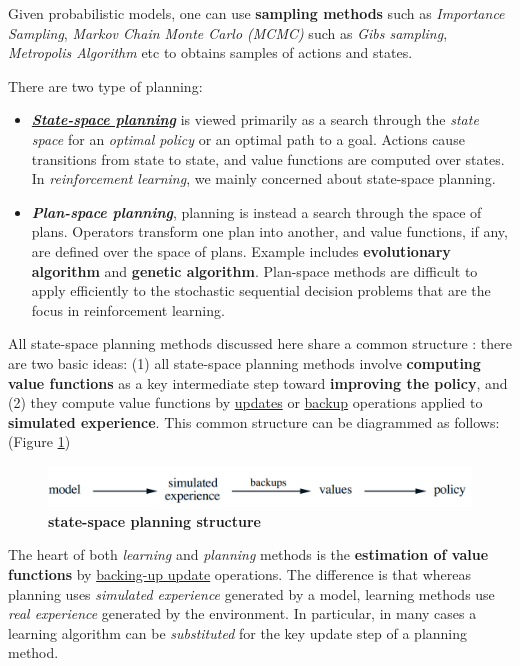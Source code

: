 \documentclass[11pt]{article}
\begin{document}
Given probabilistic models, one can use \textbf{sampling methods} \citep{liu2001monte} such as \emph{Importance Sampling},  \emph{Markov Chain Monte Carlo (MCMC)} such as \emph{Gibs sampling}, \emph{Metropolis Algorithm} etc to obtains samples of actions and states. 


There are two type of planning:
\begin{itemize}
\item \underline{\emph{\textbf{State-space planning}}} is viewed primarily as a search through the \emph{state space} for an \emph{optimal policy} or an optimal path to a goal. Actions cause transitions from state to state, and value functions are computed over states. In \emph{reinforcement learning}, we mainly concerned about state-space planning. 

\item \emph{\textbf{Plan-space planning}}, planning is instead a search through the space of plans. Operators transform one plan into another, and value functions, if any, are defined over the space of plans. Example includes \textbf{evolutionary algorithm} and \textbf{genetic algorithm}.  Plan-space methods are difficult to apply efficiently to the stochastic sequential decision problems that are the focus in reinforcement learning.
\end{itemize}

All state-space planning methods discussed here share a common structure : there are two basic ideas: (1) all state-space planning methods involve \textbf{computing value functions} as a key intermediate step toward \textbf{improving the policy}, and (2) they compute value functions by \underline{updates} or \underline{backup} operations applied to \textbf{simulated experience}. This common structure can be diagrammed as follows: (Figure \ref{fig: state_space_planning})

\begin{figure}
\begin{minipage}[t]{1\linewidth}
  \centering
  \centerline{\includegraphics[scale = 0.3]{state-space_planning.png}}
\end{minipage}
\caption{\footnotesize{\textbf{state-space planning structure}}}
\label{fig: state_space_planning}
\end{figure}

The heart of both \emph{learning} and \emph{planning} methods is the \textbf{estimation of value functions} by \underline{backing-up update} operations.  The
difference is that whereas planning uses \emph{simulated experience} generated by a model, learning methods use \emph{real experience} generated by the environment. In particular, in many cases a learning algorithm can be \emph{substituted} for the key update step of a planning method. 
\end{document}
